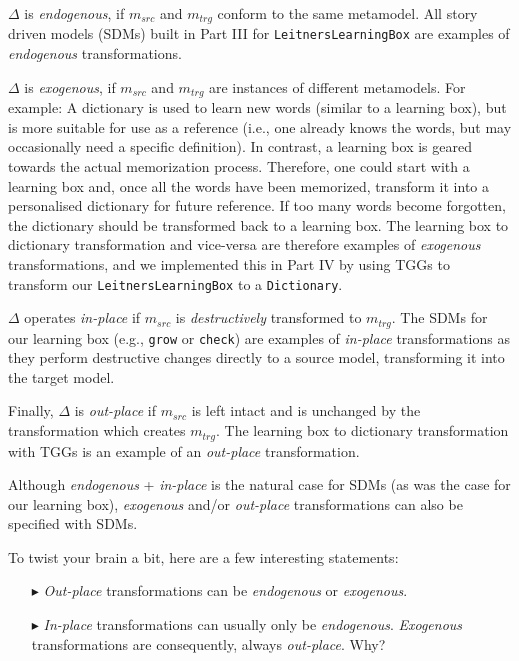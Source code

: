 $\Delta$ is \emph{endogenous}, if $m_{src}$ and $m_{trg}$ conform to the same metamodel. All story driven models (SDMs) built in Part III for
\texttt{LeitnersLearningBox} are examples of \emph{endogenous} transformations.

$\Delta$ is \emph{exogenous}, if $m_{src}$ and $m_{trg}$ are instances of different metamodels. For example: A dictionary is used to learn new
words (similar to a learning box), but is more suitable for use as a reference (i.e., one already knows the words, but may occasionally need a specific
definition). In contrast, a learning box is geared towards the actual memorization process. Therefore, one could start with a learning box and, once all the
words have been memorized, transform it into a personalised dictionary for future reference. If too many words become forgotten, the dictionary should be
transformed back to a learning box. The learning box to dictionary transformation and vice-versa are therefore examples of \emph{exogenous} transformations, and
we implemented this in Part IV by using TGGs to transform our \texttt{LeitnersLearningBox} to a \texttt{Dictionary}.

$\Delta$ operates \emph{in-place} if $m_{src}$ is \emph{destructively} transformed to $m_{trg}$. The SDMs for our learning box (e.g.,
\texttt{grow} or \texttt{check}) are examples of \emph{in-place} transformations as they perform destructive changes directly to a source model, transforming it
into the target model.

Finally, $\Delta$ is \emph{out-place} if $m_{src}$ is left intact and is unchanged by the transformation which creates $m_{trg}$. The
learning box to dictionary transformation with TGGs is an example of an \emph{out-place} transformation.

Although \emph{endogenous} + \emph{in-place} is the natural case for SDMs (as was the case for our learning box), \emph{exogenous} and/or \emph{out-place}
transformations can also be specified with SDMs. 
 
\newpage
 
To twist your brain a bit, here are a few interesting statements:
\begin{enumerate}

\item[$\blacktriangleright$] \emph{Out-place} transformations can be \emph{endogenous} or \emph{exogenous}.

\item[$\blacktriangleright$] \emph{In-place} transformations can usually only be \emph{endogenous}. \emph{Exo\-gen\-ous} transformations are consequently,
always \emph{out-place}.  Why?

\end{enumerate}  

